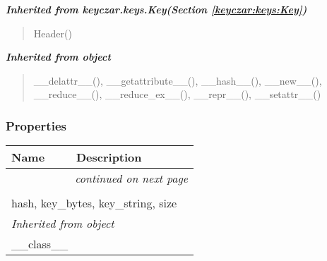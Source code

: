 \large{\textbf{\textit{Inherited from keyczar.keys.Key\textit{(Section \ref{keyczar:keys:Key})}}}}

\begin{quote}
Header()
\end{quote}

\large{\textbf{\textit{Inherited from object}}}

\begin{quote}
\_\_delattr\_\_(), \_\_getattribute\_\_(), \_\_hash\_\_(), \_\_new\_\_(), \_\_reduce\_\_(), \_\_reduce\_ex\_\_(), \_\_repr\_\_(), \_\_setattr\_\_()
\end{quote}


  \subsubsection{Properties}

    \vspace{-1cm}
\hspace{\varindent}\begin{longtable}{|p{\varnamewidth}|p{\vardescrwidth}|l}
\cline{1-2}
\cline{1-2} \centering \textbf{Name} & \centering \textbf{Description}& \\
\cline{1-2}
\endhead\cline{1-2}\multicolumn{3}{r}{\small\textit{continued on next page}}\\\endfoot\cline{1-2}
\endlastfoot\multicolumn{2}{|l|}{\textit{Inherited from keyczar.keys.Key \textit{(Section \ref{keyczar:keys:Key})}}}\\
\multicolumn{2}{|p{\varwidth}|}{\raggedright hash, key\_bytes, key\_string, size}\\
\cline{1-2}
\multicolumn{2}{|l|}{\textit{Inherited from object}}\\
\multicolumn{2}{|p{\varwidth}|}{\raggedright \_\_class\_\_}\\
\cline{1-2}
\end{longtable}



